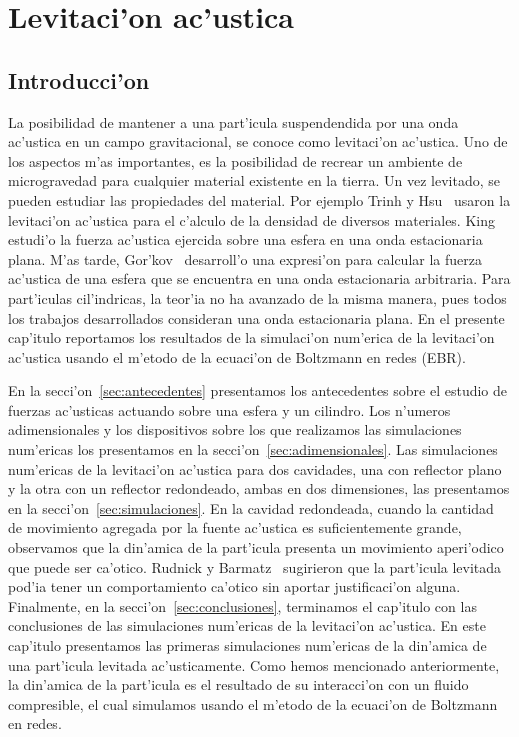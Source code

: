 \chapter{Levitaci'on ac'ustica}

\section{Introducci'on}

La posibilidad de mantener a una part'icula suspendendida por una onda ac'ustica en un
campo gravitacional, se conoce como levitaci'on ac'ustica. Uno de los aspectos m'as importantes,
es la posibilidad de recrear un ambiente de microgravedad para cualquier material existente en
la tierra. Un vez levitado, se pueden estudiar las propiedades del material. Por
ejemplo Trinh y Hsu~\cite{trinh86} usaron la levitaci'on ac'ustica para el c'alculo de la
densidad de diversos materiales. King~\cite{king34} estudi'o la fuerza ac'ustica ejercida sobre
una esfera en una onda estacionaria plana. M'as tarde, Gor'kov~\cite{gorkov62} desarroll'o una
expresi'on para calcular la fuerza ac'ustica de una esfera que se encuentra en una onda estacionaria
arbitraria. Para part'iculas cil'indricas, la teor'ia no ha avanzado de la misma manera, pues todos
los trabajos desarrollados consideran una onda estacionaria plana.
En el presente cap'itulo reportamos los resultados  de la simulaci'on
num'erica de la levitaci'on ac'ustica usando el m'etodo de la ecuaci'on de Boltzmann en redes (EBR).



En la secci'on~\ref{sec:antecedentes} presentamos los antecedentes sobre el estudio de fuerzas
ac'usticas actuando sobre una esfera y un cilindro. Los n'umeros adimensionales y los dispositivos
sobre los que realizamos las simulaciones num'ericas los presentamos en la secci'on~\ref{sec:adimensionales}.
Las simulaciones num'ericas de la levitaci'on ac'ustica para dos cavidades, una con reflector plano
y la otra con un reflector redondeado, ambas en dos dimensiones, las presentamos en
la secci'on~\ref{sec:simulaciones}.  
En la cavidad redondeada, cuando la cantidad de movimiento agregada por la fuente ac'ustica
es suficientemente grande, observamos que la din'amica de la part'icula presenta
un movimiento aperi'odico que puede ser ca'otico.
Rudnick y Barmatz~\cite{rudnick90} sugirieron que la part'icula levitada pod'ia tener
un comportamiento ca'otico sin aportar justificaci'on alguna.
Finalmente, en la secci'on~\ref{sec:conclusiones}, 
terminamos el cap'itulo con las conclusiones de las simulaciones num'ericas de la levitaci'on ac'ustica.
En este cap'itulo presentamos las primeras simulaciones num'ericas de la din'amica de una part'icula
levitada ac'usticamente. Como hemos mencionado anteriormente, la din'amica de la part'icula es el
resultado de su interacci'on con un fluido compresible, el cual simulamos usando el m'etodo de la
ecuaci'on de Boltzmann en redes.

